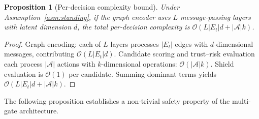 \documentclass[10pt,journal,compsoc]{IEEEtran}
\newtheorem{proposition}{Proposition}
\begin{document}
\begin{proposition}[Per-decision complexity bound]
\label{prop:complexity}
Under Assumption~\ref{asm:standing}, if the graph encoder uses $L$ message-passing layers with latent dimension $d$, the total per-decision complexity is $\mathcal{O}(L|E_t|d + |\mathcal{A}|k)$.
\end{proposition}
\begin{proof}
Graph encoding: each of $L$ layers processes $|E_t|$ edges with $d$-dimensional messages, contributing $\mathcal{O}(L|E_t|d)$.
Candidate scoring and trust--risk evaluation each process $|\mathcal{A}|$ actions with $k$-dimensional operations: $\mathcal{O}(|\mathcal{A}|k)$.
Shield evaluation is $\mathcal{O}(1)$ per candidate.
Summing dominant terms yields $\mathcal{O}(L|E_t|d + |\mathcal{A}|k)$.
\end{proof}

The following proposition establishes a non-trivial safety property of the multi-gate architecture.
\end{document}
